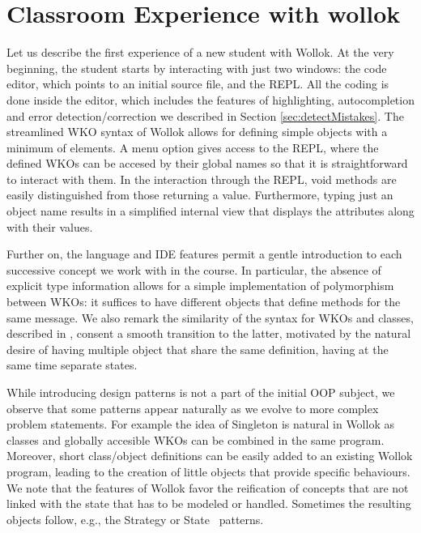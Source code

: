 \section{Classroom Experience with wollok}
\label{sec:experience}

Let us describe the first experience of a new student with Wollok.
At the very beginning, the student starts by interacting with just two windows: the code editor, which points to an initial source file, and the REPL.
All the coding is done inside the editor, which includes the features of highlighting, autocompletion and error detection/correction we described in Section \ref{sec:detectMistakes}. 
The streamlined WKO syntax of Wollok allows for defining simple objects with a minimum of elements. 
A menu option gives access to the REPL, where the defined WKOs can be accesed by their global names so that it is straightforward to interact with them. 
In the interaction through the REPL, void methods are easily distinguished from those returning a value. 
Furthermore, typing just an object name results in a simplified internal view that displays the attributes along with their values.

Further on, the language and IDE features permit a gentle introduction to each successive concept we work with in the course. 
In particular, the absence of explicit type information allows for a simple implementation of polymorphism between WKOs: it suffices to have different objects that define methods for the same message.
We also remark the similarity of the syntax for WKOs and classes, described in , 
consent a smooth transition to the latter, motivated by the natural desire of having multiple object that share the same definition, having at the same time separate states.

While introducing design patterns is not a part of the initial OOP subject, we observe that some patterns appear naturally as we evolve to more complex problem statements.
For example the idea of Singleton is natural in Wollok as classes and globally accesible WKOs can be combined in the same program. 
Moreover, short class/object definitions can be easily added to an existing Wollok program, leading to the creation of little objects that provide specific behaviours. 
We note that the features of Wollok favor the reification of concepts that are not linked with the state that has to be modeled or handled. 
Sometimes the resulting objects follow, e.g., the Strategy or State~\cite{Gamm93b} patterns.

